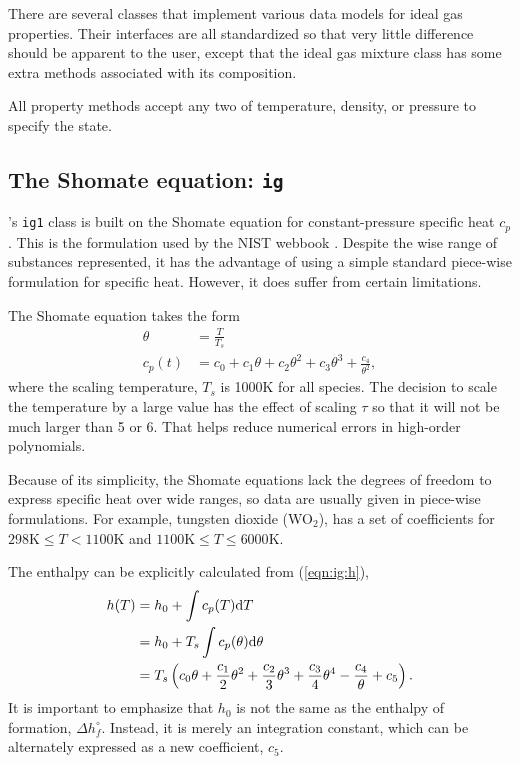 There are several classes that implement various data models for ideal gas properties.  Their interfaces are all standardized so that very little difference should be apparent to the user, except that the ideal gas mixture class has some extra methods associated with its composition.

All property methods accept any two of temperature, density, or pressure to specify the state.

\subsection{The Shomate equation: \texttt{ig}}\label{sec:ig:ig}

\PM's \texttt{ig1} class is built on the Shomate equation for constant-pressure specific heat $c_p$.  This is the formulation used by the NIST webbook \cite{nist:web}.  Despite the wise range of substances represented, it has the advantage of using a simple standard piece-wise formulation for specific heat.  However, it does suffer from certain limitations.

The Shomate equation takes the form
\begin{align}
\theta &= \frac{T}{T_s}\\
c_p(t) &= c_0 + c_1 \theta + c_2 \theta^2 + c_3 \theta^3 + \frac{c_4}{\theta^2},
\end{align}
where the scaling temperature, $T_s$ is 1000K for all species.  The decision to scale the temperature by a large value has the effect of scaling $\tau$ so that it will not be much larger than 5 or 6.  That helps reduce numerical errors in high-order polynomials.

Because of its simplicity, the Shomate equations lack the degrees of freedom to express specific heat over wide ranges, so data are usually given in piece-wise formulations.  For example, tungsten dioxide (WO$_2$), has a set of coefficients for $298\mathrm{K} \le T < 1100\mathrm{K}$ and $1100\mathrm{K} \le T \le 6000\mathrm{K}$.

The enthalpy can be explicitly calculated from (\ref{eqn:ig:h}),
\begin{align}
h(T) &= h_0 + \int c_p(T) \mathrm{d} T \nonumber\\
 &= h_0 + T_s \int c_p(\theta) \mathrm{d} \theta \nonumber\\
 &= T_s \left(c_0 \theta + \frac{c_1}{2} \theta^2 + \frac{c_2}{3} \theta^3 + \frac{c_3}{4} \theta^4 - \frac{c_4}{\theta} + c_5 \right).
\end{align}
It is important to emphasize that $h_0$ is not the same as the enthalpy of formation, $\Delta h^\circ_f$.  Instead, it is merely an integration constant, which can be alternately expressed as a new coefficient, $c_5$.

